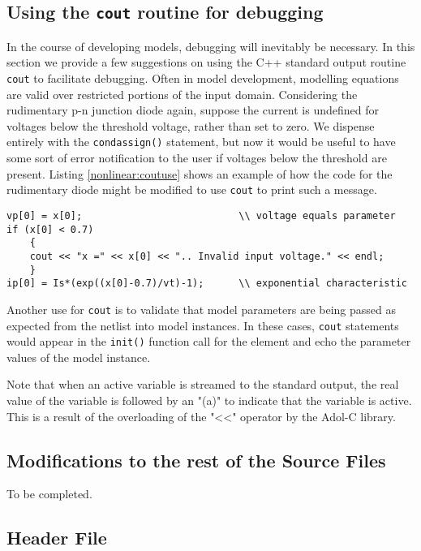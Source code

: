 \subsection{Using the \texttt{cout} routine for debugging}
In the course of developing models, debugging will
inevitably be necessary.  In this section we provide a few
suggestions on using the C++ standard output routine
\texttt{cout} to facilitate debugging.  Often in model
development, modelling equations are valid over restricted
portions of the input domain.  Considering the rudimentary
p-n junction diode again, suppose the current is undefined
for voltages below the threshold voltage, rather than set
to zero.  We dispense entirely with the \texttt{condassign()}
statement, but now it would be useful to have some sort of
error notification to the user if voltages below the threshold
are present.  Listing \ref{nonlinear:coutuse} shows an
example of how the code for the rudimentary diode might
be modified to use \texttt{cout} to print such a message.
\begin{lstlisting}[firstnumber=1, label={nonlinear:coutuse},
    caption={Using \texttt{cout} to facilitate model debugging.}]
vp[0] = x[0];                           \\ voltage equals parameter
if (x[0] < 0.7)
    {
    cout << "x =" << x[0] << ".. Invalid input voltage." << endl;
    }
ip[0] = Is*(exp((x[0]-0.7)/vt)-1);      \\ exponential characteristic
\end{lstlisting}
Another use for \texttt{cout} is to validate that model parameters
are being passed as expected from the netlist into model instances.
In these cases, \texttt{cout} statements would appear in the \texttt{init()}
function call for the element and echo the parameter values of
the model instance.

Note that when an active variable is streamed to the standard
output, the real value of the variable is followed by an "(a)"
to indicate that the variable is active.  This is a result of
the overloading of the "\textless\textless"  operator by the Adol-C library.

\subsection{Modifications to the rest of the \FDA Source Files}

To be completed.

\subsection{Header File}

